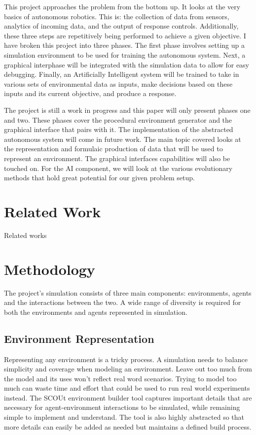 \documentclass[]{report}
\begin{document}
This project approaches the problem from the bottom up. It looks at the very basics of autonomous robotics. This is: the collection of data from sensors, analytics of incoming data, and the output of response controls. Additionally, these three steps are repetitively being performed to achieve a given objective. I have broken this project into three phases. The first phase involves setting up a simulation environment to be used for training the autonomous system. Next, a graphical interphase will be integrated with the simulation data to allow for easy debugging. Finally, an Artificially Intelligent system will be trained to take in various sets of environmental data as inputs, make decisions based on these inputs and its current objective, and produce a response.

The project is still a work in progress and this paper will only present phases one and two. These phases cover the procedural environment generator and the graphical interface that pairs with it. The implementation of the abstracted autonomous system will come in future work. The main topic covered looks at the representation and formulaic production of data that will be used to represent an environment. The graphical interfaces capabilities will also be touched on. For the AI component, we will look at the various evolutionary methods that hold great potential for our given problem setup.



\section{Related Work}
Related works



\section{Methodology}
The project’s simulation consists of three main components: environments, agents and the interactions between the two. A wide range of diversity is required for both the environments and agents represented in simulation.


\subsection{Environment Representation}
Representing any environment is a tricky process. A simulation needs to balance simplicity and coverage when modeling an environment. Leave out too much from the model and its uses won’t reflect real word scenarios. Trying to model too much can waste time and effort that could be used to run real world experiments instead. The SCOUt environment builder tool captures important details that are necessary for agent-environment interactions to be simulated, while remaining simple to implement and understand. The tool is also highly abstracted so that more details can easily be added as needed but maintains a defined build process.
\end{document}

